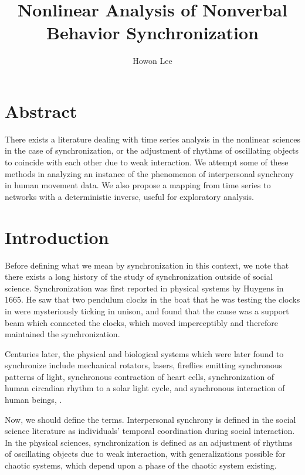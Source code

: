 \documentclass[12pt]{article}
\begin{document}
\title{Nonlinear Analysis of Nonverbal Behavior Synchronization}
\author{Howon Lee}
\maketitle

\section{Abstract}
There exists a literature dealing with time series analysis in the nonlinear sciences in the case of synchronization, or the adjustment of rhythms of oscillating objects to coincide with each other due to weak interaction. We attempt some of these methods in analyzing an instance of the phenomenon of interpersonal synchrony in human movement data. We also propose a mapping from time series to networks with a deterministic inverse, useful for exploratory analysis.


\section{Introduction}

Before defining what we mean by synchronization in this context, we note that there exists a long history of the study of synchronization outside of social science. Synchronization was first reported in physical systems by Huygens in 1665. He saw that two pendulum clocks in the boat that he was testing the clocks in were mysteriously ticking in unison, and found that the cause was a support beam which connected the clocks, which moved imperceptibly and therefore maintained the synchronization\cite{physsync}.

Centuries later, the physical and biological systems which were later found to synchronize include mechanical rotators, lasers, fireflies emitting synchronous patterns of light, synchronous contraction of heart cells, synchronization of human circadian rhythm to a solar light cycle, and synchronous interaction of human beings\cite{syncreview}, \cite{physsync}.

Now, we should define the terms. Interpersonal synchrony is defined in the social science literature as individuals' temporal coordination during social interaction\cite{socialsync}. In the physical sciences, synchronization is defined as an adjustment of rhythms of oscillating objects due to weak interaction, with generalizations possible for chaotic systems, which depend upon a phase of the chaotic system existing\cite{physsync}.
\end{document}
